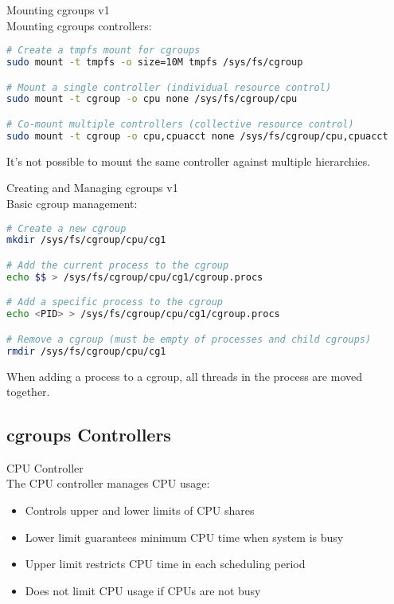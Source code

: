 \begin{code}{Mounting cgroups v1}\\
    Mounting cgroups controllers:
    
\begin{lstlisting}[language=bash, style=basesmol]
# Create a tmpfs mount for cgroups
sudo mount -t tmpfs -o size=10M tmpfs /sys/fs/cgroup

# Mount a single controller (individual resource control)
sudo mount -t cgroup -o cpu none /sys/fs/cgroup/cpu

# Co-mount multiple controllers (collective resource control)
sudo mount -t cgroup -o cpu,cpuacct none /sys/fs/cgroup/cpu,cpuacct
\end{lstlisting}

    It's not possible to mount the same controller against multiple hierarchies.
\end{code}

\begin{code}{Creating and Managing cgroups v1}\\
    Basic cgroup management:
    
\begin{lstlisting}[language=bash, style=basesmol]
# Create a new cgroup
mkdir /sys/fs/cgroup/cpu/cg1

# Add the current process to the cgroup
echo $$ > /sys/fs/cgroup/cpu/cg1/cgroup.procs

# Add a specific process to the cgroup
echo <PID> > /sys/fs/cgroup/cpu/cg1/cgroup.procs

# Remove a cgroup (must be empty of processes and child cgroups)
rmdir /sys/fs/cgroup/cpu/cg1
\end{lstlisting}

    When adding a process to a cgroup, all threads in the process are moved together.
\end{code}

\subsection{cgroups Controllers}

\begin{definition}{CPU Controller}\\
    The CPU controller manages CPU usage:
    \begin{itemize}
        \item Controls upper and lower limits of CPU shares
        \item Lower limit guarantees minimum CPU time when system is busy
        \item Upper limit restricts CPU time in each scheduling period
        \item Does not limit CPU usage if CPUs are not busy
    \end{itemize}
\end{definition}


